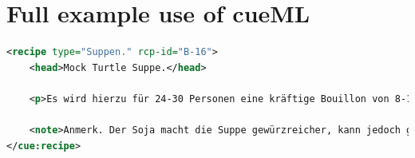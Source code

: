 \documentclass[12pt, twoside]{report}
\begin{document}
\chapter{Full example use of cueML} \label{appendix:fullUseOfCueML}

\begin{lstlisting}[language=XML, caption={Without cueML}]
<recipe type="Suppen." rcp-id="B-16">
	<head>Mock Turtle Suppe.</head>
	
	<p>Es wird hierzu für 24-30 Personen eine kräftige Bouillon von 8-10 Pfund Rindfleisch mit Wurzelwerk gekocht. Zugleich bringt man einen großen Kalbskopf, eine Schweineschnauze und Ohren, einen Ochsengaumen und eine geräucherte Ochsenzunge zu Feuer und kocht dies Alles gahr, aber nicht zu weich. Kalt, schneidet man es in kleine, länglich viereckige Stückchen, gibt das Fleisch in die Bouillon, nebst braunem Gewürz, ein Paar Messerspitzen Cayenne-Pfeffer, einige Kalbsmidder in Stückchen geschnitten (siehe Vorbereitungsregeln), kleine Saucissen, so viel Kalbskopfbrühe, daß man hinreichend Suppe hat, und macht dies mit in Butter braun gemachtem Mehl gebunden. Nachdem dies Alles 1/4 Stunde gekocht hat, kommen noch Klöße von Kalbfleisch, einige hart gekochte Eier in Würfel geschnitten, ein Paar Eßlöffel Engl. Soja hinzu, und wenn die Klößchen einige Minuten gekocht haben, 1/2 Flasche Madeira und auch Austern, wenn man sie haben kann. Dann wird die Suppe sogleich angerichtet.</p>
	
	<note>Anmerk. Der Soja macht die Suppe gewürzreicher, kann jedoch gut wegbleiben, und statt Madeira kann man weißen Franzwein und etwas Rum nehmen. Sowohl die Bouillon als Kalbskopf können schon am vorhergehenden Tage, ohne Nachtheil der Suppe, gekocht werden. </note>
</cue:recipe>
\end{lstlisting}
\end{document}

